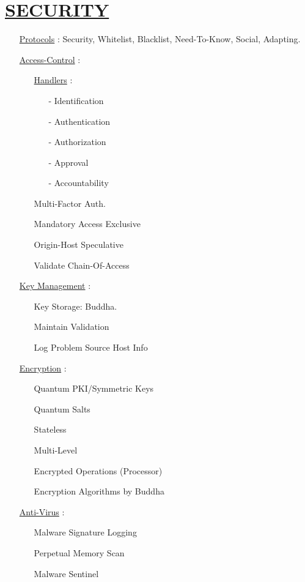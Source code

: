 \documentclass[11pt]{article}
\begin{document}
\section*{\ul{SECURITY}}
\begin{enumerate}
	\item[] \ul{Protocols} : Security, Whitelist, Blacklist, Need-To-Know, Social, Adapting.
	
	\item[] \ul{Access-Control} :
	\begin{enumerate}
		\item[] \ul{Handlers} :
		\begin{enumerate}
			\item[-] Identification
			\item[-] Authentication
			\item[-] Authorization
			\item[-] Approval
			\item[-] Accountability
		\end{enumerate}
	
		\item[] Multi-Factor Auth.
		\item[] Mandatory Access Exclusive
		\item[] Origin-Host Speculative
		\item[] Validate Chain-Of-Access
	\end{enumerate}

	\item[] \ul{Key Management} :
	\begin{enumerate}
		\item[] Key Storage: Buddha.
		\item[] Maintain Validation
		\item[] Log Problem Source Host Info
	\end{enumerate}
	
	\item[] \ul{Encryption} :
	\begin{enumerate}
		\item[] Quantum PKI/Symmetric Keys
		\item[] Quantum Salts
		\item[] Stateless
		\item[] Multi-Level
		\item[] Encrypted Operations (Processor)
		\item[] Encryption Algorithms by Buddha %
	\end{enumerate}
	
	\item[] \ul{Anti-Virus} :
	\begin{enumerate}
		\item[] Malware Signature Logging
		\item[] Perpetual Memory Scan
		\item[] Malware Sentinel
	\end{enumerate}


\end{enumerate}
\end{document}
